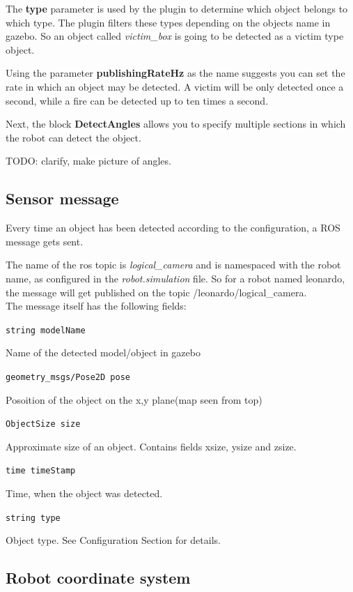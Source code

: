 The \textbf{type} parameter is used by the plugin to determine
which object belongs to which type. The plugin filters these types
depending on the objects name in gazebo. So an object called \textit{victim\_box}
is going to be detected as a victim type object.

Using the parameter \textbf{publishingRateHz} as the name suggests you can set
the rate in which an object may be detected. A victim will be only detected
once a second, while a fire can be detected up to ten times a second.

Next, the block \textbf{DetectAngles} allows you to specify multiple sections
in which the robot can detect the object.

TODO: clarify, make picture of angles.

\subsection{Sensor message}

Every time an object has been detected according to the configuration, a ROS
message gets sent.

The name of the ros topic is \textit{logical\_camera} and is namespaced with the
robot name, as configured in the \textit{robot.simulation} file.
So for a robot named leonardo, the message will get published on the topic 
/leonardo/logical\_camera.
\\

The message itself has the following fields:

\texttt{string modelName}

	Name of the detected model/object in gazebo

\texttt{geometry\_msgs/Pose2D pose}

	Posoition of the object on the x,y plane(map seen from top)

\texttt{ObjectSize size}

	Approximate size of an object. Contains fields xsize, ysize and zsize.

\texttt{time timeStamp}

	Time, when the object was detected.

\texttt{string type}

	Object type. See Configuration Section for details.

\newpage
\subsection{Robot coordinate system}

